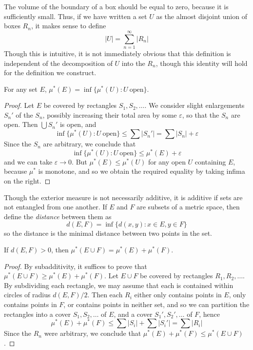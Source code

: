 The volume of the boundary of a box should be equal to zero, because it is sufficiently small. Thus, if we have written a set $U$ as the almost disjoint union of boxes $R_n$, it makes sense to define
%
\[ |U| = \sum_{n = 1}^\infty |R_n| \]
%
Though this is intuitive, it is not immediately obvious that this definition is independent of the decomposition of $U$ into the $R_n$, though this identity will hold for the definition we construct.

\begin{corollary}
  For any set $E$, $\mu^*(E) = \inf \{ \mu^*(U): U\ \text{open} \}$.
\end{corollary}
\begin{proof}
  Let $E$ be covered by rectangles $S_1, S_2, \dots$. We consider slight enlargements $S_n'$ of the $S_n$, possibly increasing their total area by some $\varepsilon$, so that the $S_n$ are open. Then $\bigcup S_n'$ is open, and
  \[ \inf \{ \mu^*(U): U\ \text{open} \} \leq \sum |S_n'| = \sum |S_n| + \varepsilon \]
  Since the $S_n$ are arbitrary, we conclude that
  \[ \inf \{ \mu^*(U): U\ \text{open} \} \leq \mu^*(E) + \varepsilon \]
  and we can take $\varepsilon \to 0$. But $\mu^*(E) \leq \mu^*(U)$ for any open $U$ containing $E$, because $\mu^*$ is monotone, and so we obtain the required equality by taking infima on the right.
\end{proof}

Though the exterior measure is not necessarily additive, it is additive if sets are not entangled from one another. If $E$ and $F$ are subsets of a metric space, then define the \emph{distance} between them as
%
\[ d(E,F) = \inf \{ d(x,y) : x \in E, y \in F \} \]
%
so the distance is the minimal distance between two points in the set.

\begin{theorem}
  If $d(E,F) > 0$, then $\mu^*(E \cup F) = \mu^*(E) + \mu^*(F)$.
\end{theorem}
\begin{proof}
  By subadditivity, it suffices to prove that $\mu^*(E \cup F) \geq \mu^*(E) + \mu^*(F)$. Let $E \cup F$ be covered by rectangles $R_1, R_2, \dots$. By subdividing each rectangle, we may assume that each is contained within circles of radius $d(E,F)/2$. Then each $R_i$ either only contains points in $E$, only contains points in $F$, or contains points in neither set, and so we can partition the rectangles into a cover $S_1, S_2, \dots$ of $E$, and a cover $S_1', S_2', \dots$ of $F$, hence
  \[ \mu^*(E) + \mu^*(F) \leq \sum |S_i| + \sum |S_i'| = \sum |R_i| \]
  Since the $R_n$ were arbitrary, we conclude that $\mu^*(E) + \mu^*(F) \leq \mu^*(E \cup F)$.
\end{proof}

